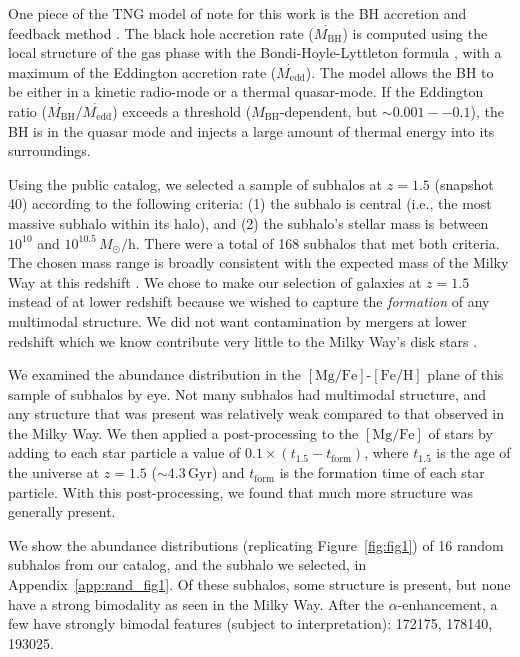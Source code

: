 \documentclass[linenumbers, twocolumn]{aastex631}
\newcommand{\Msun}{\ensuremath{M_{\odot}}}
\newcommand{\Gyr}{\ensuremath{\textrm{Gyr}}}
\newcommand{\FeH}{\ensuremath{[\textrm{Fe}/\textrm{H}]}}
\newcommand{\MgFe}{\ensuremath{[\textrm{Mg}/\textrm{Fe}]}}
\begin{document}
One piece of the TNG model of note for this work is the BH accretion and feedback method \citep{2017MNRAS.465.3291W}. The black hole accretion rate ($\dot{M_{\textrm{BH}}}$) is computed using the local structure of the gas phase with the Bondi-Hoyle-Lyttleton formula \citep{1939PCPS...35..405H,1944MNRAS.104..273B,1952MNRAS.112..195B}, with a maximum of the Eddington accretion rate ($\dot{M_{\textrm{edd}}}$). The model allows the BH to be either in a kinetic radio-mode or a thermal quasar-mode. If the Eddington ratio ($\dot{M_{\textrm{BH}}}/\dot{M_{\textrm{edd}}}$) exceeds a threshold ($M_{\textrm{BH}}$-dependent, but $\sim0.001--0.1$), the BH is in the quasar mode and injects a large amount of thermal energy into its surroundings.

Using the public catalog, we selected a sample of subhalos at $z=1.5$ (snapshot 40) according to the following criteria: (1) the subhalo is central (i.e., the most massive subhalo within its halo), and (2) the subhalo's stellar mass is between $10^{10}$ and $10^{10.5}\,\Msun/\textrm{h}$. There were a total of 168 subhalos that met both criteria. The chosen mass range is broadly consistent with the expected mass of the Milky Way at this redshift \citep{2013ApJ...771L..35V}. We chose to make our selection of galaxies at $z=1.5$ instead of at lower redshift because we wished to capture the \textit{formation} of any multimodal structure. We did not want contamination by mergers at lower redshift which we know contribute very little to the Milky Way's disk stars \citep[e.g.,][]{2016ARA&A..54..529B}.

We examined the abundance distribution in the \MgFe{}-\FeH{} plane of this sample of subhalos by eye. Not many subhalos had multimodal structure, and any structure that was present was relatively weak compared to that observed in the Milky Way. We then applied a post-processing to the \MgFe{} of stars by adding to each star particle a value of $0.1\times\left(t_{1.5}-t_{\textrm{form}}\right)$, where $t_{1.5}$ is the age of the universe at $z=1.5$ ($\sim4.3\,\Gyr$) and $t_{\textrm{form}}$ is the formation time of each star particle. With this post-processing, we found that much more structure was generally present.

We show the abundance distributions (replicating Figure~\ref{fig:fig1}) of 16 random subhalos from our catalog, and the subhalo we selected, in Appendix~\ref{app:rand_fig1}. Of these subhalos, some structure is present, but none have a strong bimodality as seen in the Milky Way. After the $\alpha$-enhancement, a few have strongly bimodal features (subject to interpretation): 172175, 178140, 193025.
\end{document}

